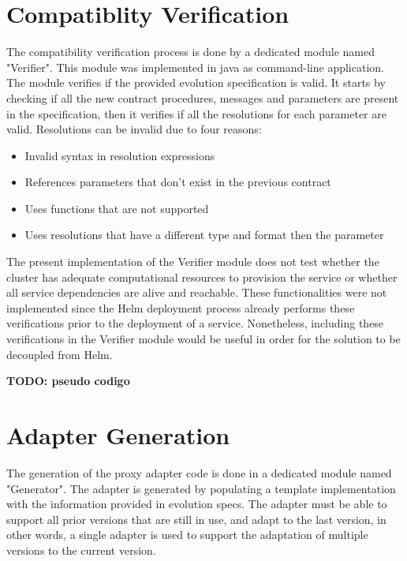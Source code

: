 \section{Compatiblity Verification} %
\label{sec:compatiblity_verification}

The compatibility verification process is done by a dedicated module named "Verifier".
This module was implemented in java as command-line application.
The module verifies if the provided evolution specification is valid.
It starts by checking if all the new contract procedures, messages and parameters are present in the specification,
then it verifies if all the resolutions for each parameter are valid.
Resolutions can be invalid due to four reasons:

\begin{itemize}
    \setlength\itemsep{0em}
    \item Invalid syntax in resolution expressions
    \item References parameters that don't exist in the previous contract
    \item Uses functions that are not supported
    \item Uses resolutions that have a different type and format then the parameter
\end{itemize}

The present implementation of the Verifier module does not test whether the cluster has adequate computational resources to provision the service or whether all service dependencies are alive and reachable.
These functionalities were not implemented since the Helm deployment process already performs these verifications prior to the deployment of a service.
Nonetheless, including these verifications in the Verifier module would be useful in order for the solution to be decoupled from Helm.

\textbf{TODO: pseudo codigo}

\newpage

\section{Adapter Generation} %
\label{sec:adapter_generation}

The generation of the proxy adapter code is done in a dedicated module named "Generator".
The adapter is generated by populating a template implementation with the information provided in evolution specs.
The adapter must be able to support all prior versions that are still in use, and adapt to the last version, in other words,
a single adapter is used to support the adaptation of multiple versions to the current version.

